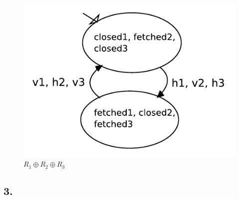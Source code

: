 \documentclass[12pt, paper=a4]{article}
\begin{document}
\begin{figure}[h!]
\centering
\includegraphics[scale=0.7]{r1r2r3_prod.pdf}
\caption{$R_1 \oplus R_2 \oplus R_3$}
\end{figure}

\subsection*{3.}
\end{document}
